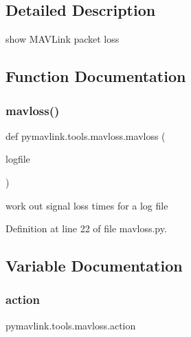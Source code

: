 \subsection{Detailed Description}
\begin{DoxyVerb}show MAVLink packet loss
\end{DoxyVerb}
 

\subsection{Function Documentation}
\mbox{\label{namespacepymavlink_1_1tools_1_1mavloss_ad6189b16a6cc39452070425c82c2835b}} 
\subsubsection{\texorpdfstring{mavloss()}{mavloss()}}
{\footnotesize\ttfamily def pymavlink.\+tools.\+mavloss.\+mavloss (\begin{DoxyParamCaption}\item[{}]{logfile }\end{DoxyParamCaption})}

\begin{DoxyVerb}work out signal loss times for a log file\end{DoxyVerb}
 

Definition at line 22 of file mavloss.\+py.



\subsection{Variable Documentation}
\mbox{\label{namespacepymavlink_1_1tools_1_1mavloss_abff94434dd555bd0ba23238ace34276a}} 
\subsubsection{\texorpdfstring{action}{action}}
{\footnotesize\ttfamily pymavlink.\+tools.\+mavloss.\+action}



